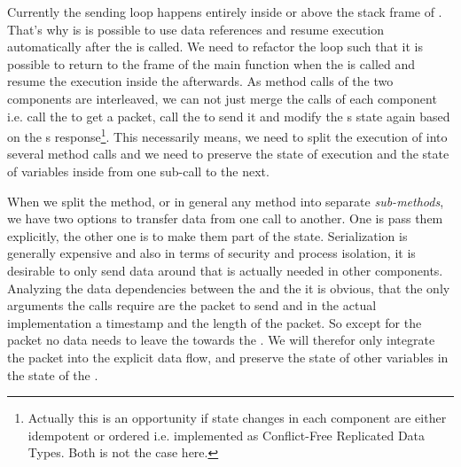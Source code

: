 Currently the sending loop happens entirely inside or above the stack frame of . That's why is is possible to use data references and resume execution automatically after the \dev{} is called. We need to refactor the loop such that it is possible to return to the frame of the main function when the \dev{} is called and resume the execution inside the \stack{} afterwards. As method calls of the two components are interleaved, we can not just merge the calls of each component i.e. call the \stack{} to get a packet, call the \dev{} to send it and modify the \stack{}s state again based on the \dev{}s response\footnote{Actually this is an opportunity if state changes in each component are either idempotent or ordered i.e. implemented as Conflict-Free Replicated Data Types. Both is not the case here.}. This necessarily means, we need to split the execution of  into several method calls and we need to preserve the state of execution and the state of variables inside  from one sub-call to the next. 

When we split the  method, or in general any method into separate \emph{sub-methods}, we have two options to transfer data from one call to another. One is pass them explicitly, the other one is to make them part of the state. Serialization is generally expensive and also in terms of security and process isolation, it is desirable to only send data around that is actually needed in other components. Analyzing the data dependencies between the \stack{} and the \dev{} it is obvious, that the only arguments the \dev{} calls require are the packet to send and in the actual implementation a timestamp and the length of the packet. So except for the packet no data needs to leave the \stack{} towards the \dev{}. We will therefor only integrate the packet into the explicit data flow, and preserve the state of other variables in the state of the \stack{}.\\

